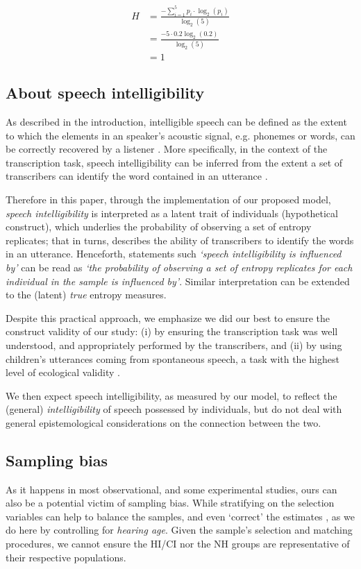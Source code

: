%
\begin{align*}
	H &= \frac{-\sum_{i=1}^{5} p_{i} \cdot \log_{2}(p_{i})}{\log_{2}(5)} \\
	&= \frac{- 5 \cdot 0.2 \log_{2}(0.2) }{\log_{2}(5)} \\
	&= 1
\end{align*} 
%
%
\subsection{About speech intelligibility} \label{sSA:SI}
%
As described in the introduction, intelligible speech can be defined as the extent to which the elements in an speaker's acoustic signal, e.g. phonemes or words, can be correctly recovered by a listener \citep{Kent_et_al_1989, Whitehill_et_al_2004, vanHeuven_2008, Freeman_et_al_2017}. More specifically, in the context of the transcription task, speech intelligibility can be inferred from the extent a set of transcribers can identify the word contained in an utterance \cite{Boonen_et_al_2021}.

Therefore in this paper, through the implementation of our proposed model, \textit{speech intelligibility} is interpreted as a latent trait of individuals (hypothetical construct), which underlies the probability of observing a set of entropy replicates; that in turns, describes the ability of transcribers to identify the words in an utterance. Henceforth, statements such \textit{`speech intelligibility is influenced by'} can be read as \textit{`the probability of observing a set of entropy replicates for each individual in the sample is influenced by'}. Similar interpretation can be extended to the (latent) \textit{true} entropy measures. 

Despite this practical approach, we emphasize we did our best to ensure the construct validity of our study: (i) by ensuring the transcription task was well understood, and appropriately performed by the transcribers, and (ii) by using children's utterances coming from spontaneous speech, a task with the highest level of ecological validity \cite{Flipsen_2006,Ertmer_2011}.

We then expect speech intelligibility, as measured by our model, to reflect the (general) \textit{intelligibility} of speech possessed by individuals, but do not deal with general epistemological considerations on the connection between the two.
%
%
\subsection{Sampling bias} \label{sSA:sampling_bias}
%
As it happens in most observational, and some experimental studies, ours can also be a potential victim of sampling bias. While stratifying on the selection variables can help to balance the samples, and even `correct' the estimates \cite{Cinelli_et_al_2021, Deffner_et_al_2022}, as we do here by controlling for \textit{hearing age}. Given the sample's selection and matching procedures, we cannot ensure the HI/CI nor the NH groups are representative of their respective populations. 

